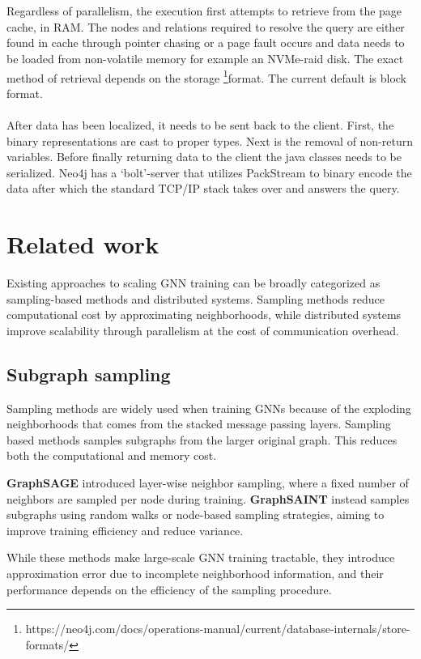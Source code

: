 \documentclass[ oneside,openright,titlepage,numbers=noenddot,headinclude,%
                footinclude=true,cleardoublepage=empty,abstractoff, %
                BCOR=0mm,paper=a4,fontsize=11pt,%
                ngerman,american,%
                ]{scrreprt}
\begin{document}
\\\\
Regardless of parallelism, the execution first attempts to retrieve from the page cache, in RAM. The nodes and relations required to resolve the query are either found in cache through pointer chasing or a page fault occurs and data needs to be loaded from non-volatile memory for example an NVMe-raid disk. The exact method of retrieval depends on the storage \footnote{https://neo4j.com/docs/operations-manual/current/database-internals/store-formats/}{format}. The current default is block format.
\\\\
After data has been localized, it needs to be sent back to the client. First, the binary representations are cast to proper types. Next is the removal of non-return variables. Before finally returning data to the client the java classes needs to be serialized. Neo4j has a `bolt'-server that utilizes PackStream to binary encode the data after which the standard TCP/IP stack takes over and answers the query.

\chapter{Related work}

Existing approaches to scaling GNN training can be broadly categorized as sampling-based methods and distributed systems.  
Sampling methods reduce computational cost by approximating neighborhoods, while distributed systems improve scalability through parallelism at the cost of communication overhead.

\section{Subgraph sampling}
Sampling methods are widely used when training GNNs because of the exploding neighborhoods that comes from the stacked message passing layers. Sampling based methods samples subgraphs from the larger original graph. This reduces both the computational and memory cost.

\textbf{GraphSAGE} introduced layer-wise neighbor sampling, where a fixed number of neighbors are sampled per node during training. 
\textbf{GraphSAINT} instead samples subgraphs using random walks or node-based sampling strategies, aiming to improve training efficiency and reduce variance.

While these methods make large-scale GNN training tractable, they introduce approximation error due to incomplete neighborhood information, and their performance depends on the efficiency of the sampling procedure.
\end{document}
